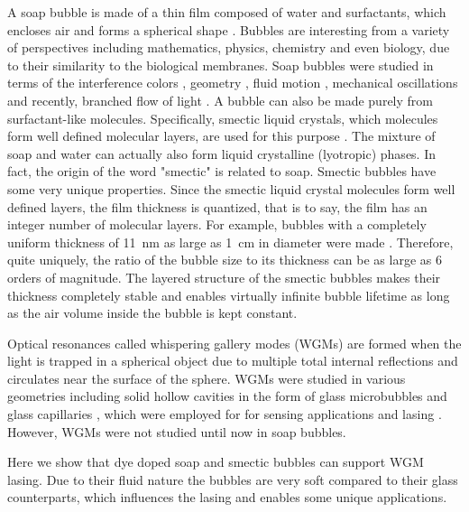 \documentclass[a4paper,12pt]{article}
\begin{document}
	
	A soap bubble is made of a thin film composed of water and surfactants, which encloses air and forms a spherical shape \cite{isenberg1978science}. Bubbles are interesting from a variety of perspectives including mathematics, physics, chemistry and even biology, due to their similarity to the biological membranes. Soap bubbles were studied in terms of the interference colors \cite{afanasyev2011measuring}, geometry \cite{almgren1976geometry,taylor1976structure}, fluid motion \cite{debregeas1998life,meuel2013intensity}, mechanical oscillations \cite{kornek2010oscillations} and recently, branched flow of light \cite{patsyk2020observation}. A bubble can also be made purely from surfactant-like molecules. Specifically, smectic liquid crystals, which molecules form well defined molecular layers, are used for this purpose \cite{stannarius1998self,may2012dynamics,clark2017realization,lopez2011nematic}. The mixture of soap and water can actually also form liquid crystalline (lyotropic) phases. In fact, the origin of the word "smectic" is related to soap. Smectic bubbles have some very unique properties. Since the smectic liquid crystal molecules form well defined layers, the film thickness is quantized, that is to say, the film has an integer number of molecular layers. For example, bubbles with a completely uniform thickness of \SI{11}{nm} as large as \SI{1}{cm} in diameter were made \cite{stannarius1998self}. Therefore, quite uniquely, the ratio of the bubble size to its thickness can be as large as 6 orders of magnitude. The layered structure of the smectic bubbles makes their thickness completely stable and enables virtually infinite bubble lifetime as long as the air volume inside the bubble is kept constant. 
	
	Optical resonances called whispering gallery modes (WGMs) are formed when the light is trapped in a spherical object due to multiple total internal reflections and circulates near the surface of the sphere. WGMs were studied in various geometries including solid hollow cavities in the form of glass microbubbles \cite{sumetsky2010optical,watkins2011single} and glass capillaries \cite{shopova2007optofluidic}, which were employed for for sensing applications \cite{ward2014hollow} and lasing \cite{shopova2007optofluidic,chen2016lasing}. However, WGMs were not studied until now in soap bubbles.
	
	
	Here we show that dye doped soap and smectic bubbles can support WGM lasing. Due to their fluid nature the bubbles are very soft compared to their glass counterparts, which influences the lasing and enables some unique applications.
	
\end{document}
